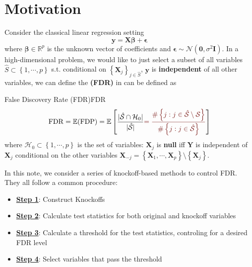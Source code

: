 \documentclass[twoside]{article}
\begin{document}

\section{Motivation}
Consider the classical linear regression setting
$$
\mathbf{y} = \mathbf{X}\boldsymbol{\beta} + \boldsymbol{\epsilon}
$$
where $\boldsymbol{\beta}\in\mathbb{R}^p$ is the unknown vector of coefficients and $\boldsymbol{\epsilon}\sim \mathcal{N}(\mathbf{0},\sigma^2\mathbf{I})$. In a high-dimensional problem, we would like to just select a subset of all variables $\hat{S}\subset \left\{ 1,\cdots,p \right\}$ s.t. conditional on $\left\{\mathbf{X}_j\right\}_{j\in\hat{S}}$, $\mathbf{y}$ is \textbf{independent} of all other variables, we can define the  \textbf{(FDR)} in can be defined as 
\begin{definition}{False Discovery Rate (FDR)}{FDR}
    \begin{align*}
        \mathrm{FDR} = \mathbb{E}(\mathrm{FDP}) = \mathbb{E}\left[ \frac{\lvert \hat{\mathcal{S}}\cap \mathcal{H}_0 \rvert}{ \lvert \hat{\mathcal{S}} \rvert } \textcolor{myred}{ =\frac{\#\left\{ j:j\in\hat{\mathcal{S}}\setminus \mathcal{S}\right\} }{\#\left\{ j:j\in\hat{\mathcal{S}}\right\} }} \right]
    \end{align*}
    where $\mathcal{H}_0\subset \left\{1,\cdots,p\right\}$ is the set of  variables: $\mathbf{X}_j$ is {\textbf{null}} iff $\mathbf{Y}$ is independent of $\mathbf{X}_j$ conditional on the other variables $\mathbf{X}_{-j}=\left\{\mathbf{X}_1,\cdots,\mathbf{X}_p\right\}\setminus \left\{\mathbf{X}_j\right\}$.
\end{definition}

In this note, we consider a series of knockoff-based methods to control FDR. They all follow a common procedure:
\begin{itemize}
    \item \textbf{\underline{Step 1}}: Construct Knockoffs 
    \item \textbf{\underline{Step 2}}: Calculate test statistics for both original and knockoff variables
    \item \textbf{\underline{Step 3}}: Calculate a threshold for the test statistics, controling for a desired FDR level
    \item \textbf{\underline{Step 4}}: Select variables that pass the threshold
\end{itemize}
\end{document}
